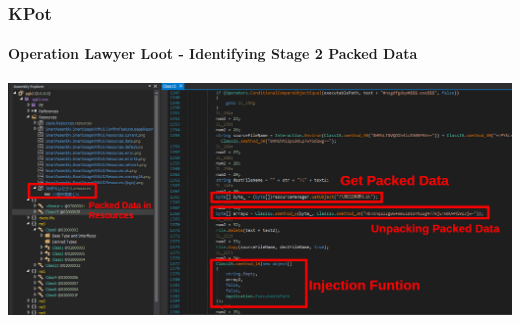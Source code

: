 \documentclass[aspectratio=169]{beamer}
\begin{document}
{
\begin{frame}
  \frametitle{KPot}
  \framesubtitle{Operation Lawyer Loot - Identifying Stage 2 Packed Data}
  \begin{center}
    \includegraphics[width=14cm]{kpot-unpacking-4}
  \end{center}
\end{frame}
}
\end{document}
